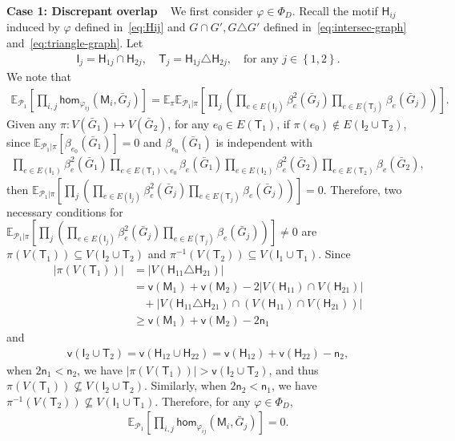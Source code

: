 \documentclass[letterpaper,11pt]{article}
\theoremstyle{definition}
\newcommand{\maP}{\mathcal{P}}
\newcommand{\vn}{\mathsf{{v}}}
\newcommand{\pth}[1]{\left( #1 \right)}
\newcommand{\qth}[1]{\left[ #1 \right]}
\newcommand{\sth}[1]{\left\{ #1 \right\}}
\newcommand{\sfH}{{\mathsf{H}}}
\newcommand{\sfI}{{\mathsf{I}}}
\newcommand{\sfM}{{\mathsf{M}}}
\newcommand{\sfT}{{\mathsf{T}}}
\newcommand{\sfn}{{\mathsf{n}}}
\renewcommand{\hom}{\mathsf{hom}}
\newcommand{\vp}{\varphi}
\def\E{\mathbb{E}}
\begin{document}
\textbf{Case 1: Discrepant overlap\ \ }We first consider $\vp \in \Phi_D$. Recall the motif $\sfH_{ij}$ induced by $\vp$ defined in~\eqref{eq:Hij} and $G\cap G',G\triangle G'$ defined in~\eqref{eq:intersec-graph} and~\eqref{eq:triangle-graph}.
    Let   \begin{align}\label{eq:def_of_T1T2}
        \sfI_j = \sfH_{1j}\cap \sfH_{2j},\quad \sfT_j = \sfH_{1j}\triangle \sfH_{2j},\quad \text{for any }j\in \sth{1,2}.
    \end{align}
    We note that \begin{align*}
        \E_{\maP_1}\qth{\prod_{i,j}\hom_{\vp_{ij}}(\sfM_i,\bar{G}_j)}  =\E_\pi \E_{\maP_1|\pi}\qth{\prod_{j}\pth{\prod_{e\in E(\sfI_j)} \beta_e^2(\bar{G}_j) \prod_{e\in E(\sfT_j)} \beta_e(\bar{G}_j)} }.
    \end{align*}
Given any $\pi:V(\bar{G}_1)\mapsto V(\bar{G}_2)$,   for any $e_0\in E(\sfT_1)$, if $\pi(e_0)\notin E(\sfI_2\cup \sfT_2)$, since $\E_{\maP_1|\pi}\qth{\beta_{e_0}(\bar{G}_1)} = 0$ and $\beta_{e_0}(\bar{G}_1)$ is independent with \begin{align*}
         \prod_{e\in E(\sfI_1)} \beta_e^2(\bar{G}_1) \prod_{e\in E(\sfT_1)\backslash e_0} \beta_e(\bar{G}_1)\prod_{e\in E(\sfI_2)}\beta_e^2(\bar{G}_2)\prod_{e\in E(\sfT_2) }\beta_e(\bar{G}_2),
    \end{align*}
    then $\E_{\maP_1|\pi}\qth{\prod_{j}\pth{\prod_{e\in E(\sfI_j)} \beta_e^2(\bar{G}_j) \prod_{e\in E(\sfT_j)} \beta_e(\bar{G}_j)} }=0$. 
    Therefore,  two necessary conditions for $\E_{\maP_1|\pi}\qth{\prod_{j}\pth{\prod_{e\in E(\sfI_j)} \beta_e^2(\bar{G}_j) \prod_{e\in E(\sfT_j)} \beta_e(\bar{G}_j)} }\neq 0$ are $\pi(V(\sfT_1))\subseteq V(\sfI_2\cup \sfT_2)$ and $\pi^{-1}(V(\sfT_2))\subseteq V(\sfI_1\cup \sfT_1)$. 
    Since \begin{align*}
        |\pi(V(\sfT_1))| &= |V(\sfH_{11}\triangle \sfH_{21})|\\ &= \vn(\sfM_1)+\vn(\sfM_2)-2|V(\sfH_{11})\cap V(\sfH_{21})|\\&~~~~+|V(\sfH_{11}\triangle \sfH_{21})\cap (V(\sfH_{11})\cap V(\sfH_{21}))|\\&\ge \vn(\sfM_1)+\vn(\sfM_2)-2\sfn_1\end{align*} and \begin{align*} \vn(\sfI_2\cup \sfT_2) = \vn(\sfH_{12}\cup\sfH_{22}) =  \vn(\sfH_{12})+\vn(\sfH_{22})-\sfn_2,
    \end{align*}
when $2\sfn_1<\sfn_2$, we have $|\pi(V(\sfT_1))|>\vn(\sfI_2\cup\sfT_2)$, and thus $\pi(V(\sfT_1))\nsubseteq V(\sfI_2\cup \sfT_2)$. Similarly, when $2\sfn_2<\sfn_1$, we have $\pi^{-1}(V(\sfT_2))\nsubseteq V(\sfI_1\cup \sfT_1)$. Therefore, for any $\vp\in \Phi_D$, 
\begin{align*}
        \E_{\maP_1}\qth{\prod_{i,j}\hom_{\vp_{ij}}(\sfM_i,\bar{G}_j)} = 0.
    \end{align*}
\end{document}
